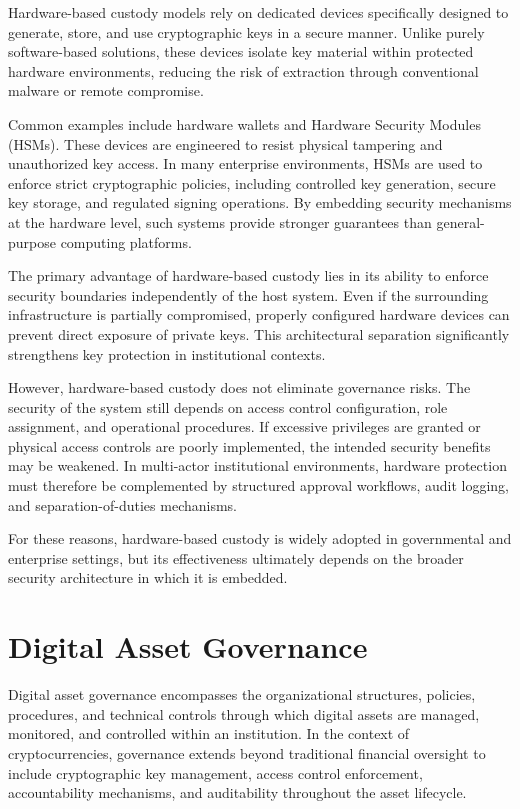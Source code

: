 \documentclass[12pt,a4paper]{report}
\begin{document}
Hardware-based custody models rely on dedicated devices specifically designed to generate, store, and use cryptographic keys in a secure manner. Unlike purely software-based solutions, these devices isolate key material within protected hardware environments, reducing the risk of extraction through conventional malware or remote compromise.

Common examples include hardware wallets and Hardware Security Modules (HSMs). These devices are engineered to resist physical tampering and unauthorized key access. In many enterprise environments, HSMs are used to enforce strict cryptographic policies, including controlled key generation, secure key storage, and regulated signing operations. By embedding security mechanisms at the hardware level, such systems provide stronger guarantees than general-purpose computing platforms.

The primary advantage of hardware-based custody lies in its ability to enforce security boundaries independently of the host system. Even if the surrounding infrastructure is partially compromised, properly configured hardware devices can prevent direct exposure of private keys. This architectural separation significantly strengthens key protection in institutional contexts.

However, hardware-based custody does not eliminate governance risks. The security of the system still depends on access control configuration, role assignment, and operational procedures. If excessive privileges are granted or physical access controls are poorly implemented, the intended security benefits may be weakened. In multi-actor institutional environments, hardware protection must therefore be complemented by structured approval workflows, audit logging, and separation-of-duties mechanisms.

For these reasons, hardware-based custody is widely adopted in governmental and enterprise settings, but its effectiveness ultimately depends on the broader security architecture in which it is embedded.


\section{Digital Asset Governance}

Digital asset governance encompasses the organizational structures, policies, procedures, and technical controls through which digital assets are managed, monitored, and controlled within an institution. In the context of cryptocurrencies, governance extends beyond traditional financial oversight to include cryptographic key management, access control enforcement, accountability mechanisms, and auditability throughout the asset lifecycle.
\end{document}
